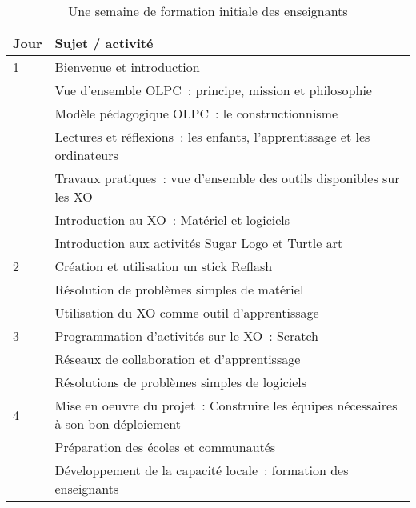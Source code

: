 \documentclass[12pt]{article}
\begin{document}
\begin{table}[htb]
\caption{Une semaine de formation initiale des enseignants} 
\begin{center}
\begin{tabular}{|l|l|}
\hline
 Jour  &  Sujet / activité                                                                     \\
\hline
    1  &  Bienvenue et introduction                                                            \\
       &  Vue d’ensemble OLPC : principe, mission et philosophie                               \\
       &  Modèle pédagogique OLPC : le constructionnisme                                       \\
       &  Lectures et réflexions : les enfants, l’apprentissage et les ordinateurs             \\
       &  Travaux pratiques : vue d’ensemble des outils disponibles sur les XO                 \\
       &  Introduction au XO : Matériel et logiciels                                           \\
\hline
       &  Introduction aux activités Sugar Logo et Turtle art                                  \\
    2  &  Création et utilisation un stick Reflash                                             \\
       &  Résolution de problèmes simples de matériel                                          \\
       &  Utilisation du XO comme outil d’apprentissage                                        \\
\hline
    3  &  Programmation d’activités sur le XO : Scratch                                        \\
       &  Réseaux de collaboration et d’apprentissage                                          \\
       &  Résolutions de problèmes simples de logiciels                                        \\
\hline
    4  &  Mise en oeuvre du projet : Construire les équipes nécessaires à son bon déploiement  \\
       &  Préparation des écoles et communautés                                                \\
       &  Développement de la capacité locale : formation des enseignants                      \\

\end{tabular}
\end{center}
\end{table}
\end{document}
